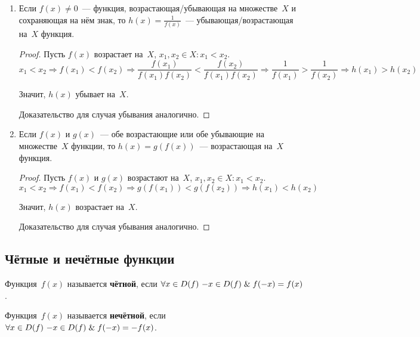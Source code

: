 \begin{enumerate}
\begin{proof}
	Значит, $h(x)$ убывает на~$X$.
	
	Доказательства для остальных трёх случаев аналогичны.
	\end{proof}
	
	\item Если $f(x) \neq 0$~--- функция, возрастающая/убывающая на множестве~$X$ и сохраняющая на нём знак, то $h(x) = \frac1{f(x)}$~--- убывающая/возрастающая на~$X$ функция.
	\begin{proof}
	Пусть $f(x)$ возрастает на~$X$, $x_1, x_2 \in X \colon x_1 < x_2$.
	\begin{equation*}
	x_1 < x_2 \Rightarrow
	f(x_1) < f(x_2) \Rightarrow
	\frac{f(x_1)}{f(x_1)f(x_2)} < \frac{f(x_2)}{f(x_1)f(x_2)} \Rightarrow
	\frac1{f(x_1)} > \frac1{f(x_2)} \Rightarrow
	h(x_1) > h(x_2)
	\end{equation*}
	
	Значит, $h(x)$ убывает на~$X$.
		
	Доказательство для случая убывания аналогично.
	\end{proof}
	
	\item Если $f(x)$ и $g(x)$~--- обе возрастающие или обе убывающие на множестве~$X$ функции, то $h(x) = g(f(x))$~--- возрастающая на~$X$ функция.
	\begin{proof}
	Пусть $f(x)$ и $g(x)$ возрастают на~$X$, $x_1, x_2 \in X \colon x_1 < x_2$.
	\begin{equation*}
	x_1 < x_2 \Rightarrow
	f(x_1) < f(x_2) \Rightarrow
	g(f(x_1)) < g(f(x_2)) \Rightarrow
	h(x_1) < h(x_2)
	\end{equation*}
	
	Значит, $h(x)$ возрастает на~$X$.
	
	Доказательство для случая убывания аналогично.
	\end{proof}
\end{enumerate}

\subsection{Чётные и нечётные функции}
 Функция~$f(x)$ называется \textbf{чётной}, если $\forall x \in D(f) \ {-x} \in D(f) \mathrel{\&} f(-x) = f(x)$.

 Функция~$f(x)$ называется \textbf{нечётной}, если $\forall x \in D(f) \ {-x} \in D(f) \mathrel{\&} f(-x) = -f(x)$.


